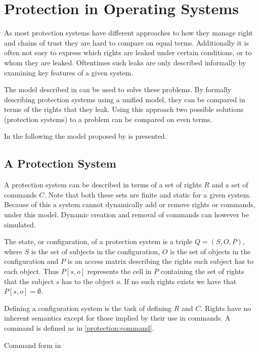 \section{Protection in Operating Systems}
As most protection systems have different approaches to how they manage right and chains of trust they are hard to compare on equal terms.
Additionally it is often not easy to express which rights are leaked under certain conditions, or to whom they are leaked.
Oftentimes such leaks are only described informally by examining key features of a given system.

The model described in \cite{HRU} can be used to solve these problems.
By formally describing protection systems using a unified model, they can be compared in terms of the rights that they leak.
Using this approach two possible solutions (protection systems) to a problem can be compared on even terms.

In the following the model proposed by \cite{HRU} is presented.

\subsection{A Protection System}
A protection system can be described in terms of a set of rights $R$ and a set of commands $C$.
Note that both these sets are finite and static for a given system.
Because of this a system cannot dynamically add or remove rights or commands, under this model.
Dynamic creation and removal of commands can however be simulated.

The state, or configuration, of a protection system is a triple $Q = (S, O, P)$, where $S$ is the set of subjects in the configuration, $O$ is the set of objects in the configuration and $P$ is an access matrix describing the rights each subject has to each object.
Thus $P[s, o]$ represents the cell in $P$ containing the set of rights that the subject $s$ has to the object $o$.
If no such rights exists we have that $P[s,o] = \emptyset$.

Defining a configuration system is the task of defining $R$ and $C$.
Rights have no inherent semantics except for those implied by their use in commands.
A command is defined as in \cref{protection:command}.

\begin{algorithm}
 \DontPrintSemicolon
 \cmd {} 
 \caption{Command form in \cite{HRU}\label{protection:command}}
\end{algorithm}